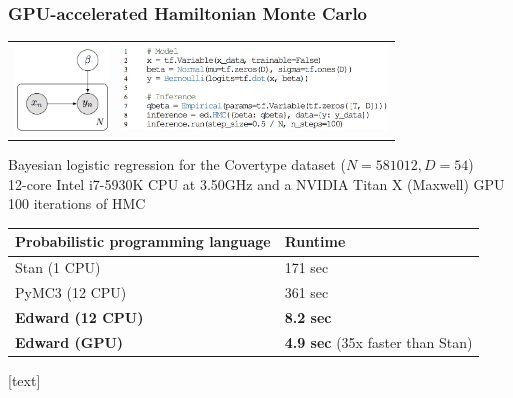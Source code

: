 \documentclass[10pt]{beamer}
\begin{document}
\begin{frame}
\frametitle{GPU-accelerated Hamiltonian Monte Carlo}
\begin{tabular}{cc}
\hspace{-1em}
\includegraphics[width=2.5cm]{img/logistic_graph.png}
&
\includegraphics[width=7cm]{img/logistic_code.png}
\end{tabular}
\vspace{1ex}

Bayesian logistic regression for the Covertype dataset ($N=581012, D=54$) \\
12-core Intel i7-5930K CPU at 3.50GHz and a NVIDIA Titan X (Maxwell) GPU \\
100 iterations of HMC
\vspace{1ex}

\begin{table}[tb]
\centering
\begin{tabular}{ll}
\toprule
Probabilistic programming language & Runtime
\\
\midrule
Stan (1 CPU) & 171 sec \\
PyMC3 (12 CPU) & 361 sec \\
\textbf{Edward (12 CPU)} & \textbf{8.2 sec} \\
\textbf{Edward (GPU)} & \textbf{4.9 sec} (35x faster than Stan)\\
\bottomrule
\end{tabular}
\end{table}
\citep{carpenter_stan_2017, salvatier_probabilistic_2015}
\end{frame}


\begin{frame}[allowframebreaks]  %
  [text]
  \renewcommand*{\bibfont}{\small}
  \printbibliography
\end{frame}
\end{document}
